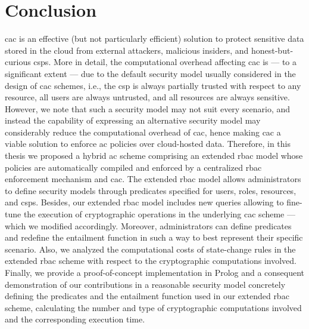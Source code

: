 \chapter{Conclusion}
\label{sec:conclusion}

\Gls{cac} is an effective (but not particularly efficient) solution to protect sensitive data stored in the cloud from external attackers, malicious insiders, and honest-but-curious \glspl{csp}. More in detail, the computational overhead affecting \gls{cac} is --- to a significant extent --- due to the default security model usually considered in the design of \gls{cac} schemes, i.e., the \gls{csp} is always partially trusted with respect to any resource, all users are always untrusted, and all resources are always sensitive.
However, we note that such a security model may not suit every scenario, and instead the capability of expressing an alternative security model may considerably reduce the computational overhead of \gls{cac}, hence making \gls{cac} a viable solution to enforce \gls{ac} policies over cloud-hosted data. 
Therefore, in this thesis we proposed a hybrid \gls{ac} scheme comprising an extended \gls{rbac} model whose policies are automatically compiled and enforced by a centralized \gls{rbac} enforcement mechanism and \gls{cac}.
The extended \gls{rbac} model allows administrators to define security models through predicates specified for users, roles, resources, and \glspl{csp}. Besides, our extended \gls{rbac} model includes new queries allowing to fine-tune the execution of cryptographic operations in the underlying \gls{cac} scheme --- which we modified accordingly. Moreover, administrators can define predicates and redefine the entailment function in such a way to best represent their specific scenario. Also, we analyzed the computational costs of state-change rules in the extended \gls{rbac} scheme with respect to the cryptographic computations involved. Finally, we provide a proof-of-concept implementation in Prolog and a consequent demonstration of our contributions in a reasonable security model concretely defining the predicates and the entailment function used in our extended \gls{rbac} scheme, calculating the number and type of cryptographic computations involved and the corresponding execution time.


